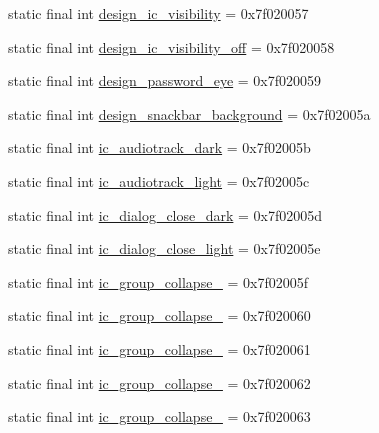 \begin{CompactItemize}
\item 
static final int \hyperlink{classandroid_1_1support_1_1v7_1_1palette_1_1_r_1_1drawable_14b761d0f6aa8ccb5a2ced4b9d48495c}{design\_\-ic\_\-visibility} = 0x7f020057
\item 
static final int \hyperlink{classandroid_1_1support_1_1v7_1_1palette_1_1_r_1_1drawable_04d634ad25302dee7229855fa4ad9459}{design\_\-ic\_\-visibility\_\-off} = 0x7f020058
\item 
static final int \hyperlink{classandroid_1_1support_1_1v7_1_1palette_1_1_r_1_1drawable_619fa05077232e09cb9e6b265f7de62f}{design\_\-password\_\-eye} = 0x7f020059
\item 
static final int \hyperlink{classandroid_1_1support_1_1v7_1_1palette_1_1_r_1_1drawable_3e8bd4a8c0ac62d13ce5eec33551dfff}{design\_\-snackbar\_\-background} = 0x7f02005a
\item 
static final int \hyperlink{classandroid_1_1support_1_1v7_1_1palette_1_1_r_1_1drawable_d8aecbe55a768aefd69be96136b4b3af}{ic\_\-audiotrack\_\-dark} = 0x7f02005b
\item 
static final int \hyperlink{classandroid_1_1support_1_1v7_1_1palette_1_1_r_1_1drawable_1498190f115dffd2d37420bc8d4c4c55}{ic\_\-audiotrack\_\-light} = 0x7f02005c
\item 
static final int \hyperlink{classandroid_1_1support_1_1v7_1_1palette_1_1_r_1_1drawable_14742da9188e114e814c1fa2a6b6e9c0}{ic\_\-dialog\_\-close\_\-dark} = 0x7f02005d
\item 
static final int \hyperlink{classandroid_1_1support_1_1v7_1_1palette_1_1_r_1_1drawable_a5f2708a4ca3cdcd896bccb10955a81e}{ic\_\-dialog\_\-close\_\-light} = 0x7f02005e
\item 
static final int \hyperlink{classandroid_1_1support_1_1v7_1_1palette_1_1_r_1_1drawable_715372613940c0af469d5d6910b2cd1c}{ic\_\-group\_\-collapse\_} = 0x7f02005f
\item 
static final int \hyperlink{classandroid_1_1support_1_1v7_1_1palette_1_1_r_1_1drawable_c4de093ccc6cd2ebb65491b6b3102b48}{ic\_\-group\_\-collapse\_} = 0x7f020060
\item 
static final int \hyperlink{classandroid_1_1support_1_1v7_1_1palette_1_1_r_1_1drawable_0eb825abf7c70fff9b47d46b0fbd6b8d}{ic\_\-group\_\-collapse\_} = 0x7f020061
\item 
static final int \hyperlink{classandroid_1_1support_1_1v7_1_1palette_1_1_r_1_1drawable_cfd65312347718b2e29f8e8b76e76845}{ic\_\-group\_\-collapse\_} = 0x7f020062
\item 
static final int \hyperlink{classandroid_1_1support_1_1v7_1_1palette_1_1_r_1_1drawable_ae9e27dfc220bc8d425dfc38f90b7abc}{ic\_\-group\_\-collapse\_} = 0x7f020063

\end{CompactItemize}
